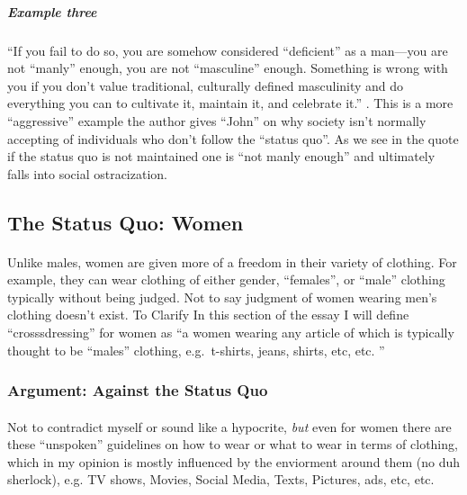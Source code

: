 \subparagraph{Example three}
``If you fail to do so, you are somehow considered ``deficient'' as a man---you
are not ``manly'' enough, you are not ``masculine'' enough. Something is wrong
with you if you don’t value traditional, culturally defined masculinity and do
everything you can to cultivate it, maintain it, and celebrate it.''
\cite[p.~1]{WDTMU}. This is a more ``aggressive'' example the author gives
``John'' on why society isn't normally accepting of individuals who don't follow
the ``status quo''. As we see in the quote if the status quo is not maintained
one is ``not manly enough'' and ultimately falls into social ostracization.

\subsection{The Status Quo: Women}
\paragraph{}
Unlike males, women are given more of a freedom in their variety of clothing.
For example, they can wear clothing of either gender, ``females'', or ``male''
clothing typically without being judged. Not to say judgment of women wearing
men's clothing doesn't exist. To Clarify In this section of the essay I will
define ``crosssdressing'' for women as ``a women wearing any article of which
is typically thought to be ``males'' clothing, e.g.\ t-shirts, jeans, shirts,
etc, etc. ''
\par

\subsubsection{Argument: Against the Status Quo}
\paragraph{}
Not to contradict myself or sound like a hypocrite, \textit{but} even for women
there are these ``unspoken'' guidelines on how to wear or what to wear in terms
of clothing, which in my opinion is mostly influenced by the enviorment around
them (no duh sherlock), e.g. TV shows, Movies, Social Media, Texts, Pictures,
ads, etc, etc.
\par

